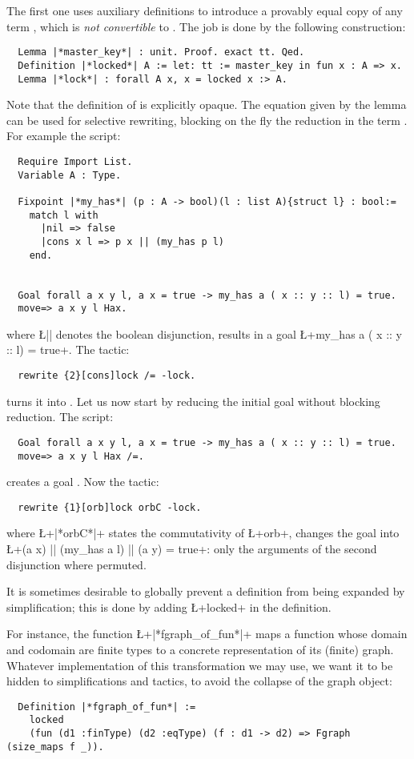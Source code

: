 The first one uses auxiliary definitions to introduce a provably equal
copy of any term , which is \emph{not convertible} to .
The job is done by the following construction:
\begin{lstlisting}
  Lemma |*master_key*| : unit. Proof. exact tt. Qed.
  Definition |*locked*| A := let: tt := master_key in fun x : A => x.
  Lemma |*lock*| : forall A x, x = locked x :> A.
\end{lstlisting}
Note that the definition of  is explicitly opaque.
The equation  given by the  lemma can be used
for selective rewriting, blocking on the fly the reduction in the
term .
For example the script:
\begin{lstlisting}
  Require Import List.
  Variable A : Type.

  Fixpoint |*my_has*| (p : A -> bool)(l : list A){struct l} : bool:=
    match l with
      |nil => false
      |cons x l => p x || (my_has p l)
    end.


  Goal forall a x y l, a x = true -> my_has a ( x :: y :: l) = true.
  move=> a x y l Hax.
\end{lstlisting}
where \L{||} denotes the boolean disjunction, results in a goal
\L+my_has a ( x :: y :: l) = true+. The tactic:
\begin{lstlisting}
  rewrite {2}[cons]lock /= -lock.
\end{lstlisting}
turns it into .
Let us now start by reducing the initial goal without blocking reduction.
The script:
\begin{lstlisting}
  Goal forall a x y l, a x = true -> my_has a ( x :: y :: l) = true.
  move=> a x y l Hax /=.
\end{lstlisting}
creates a goal . Now the
tactic:
\begin{lstlisting}
  rewrite {1}[orb]lock orbC -lock.
\end{lstlisting}
where \L+|*orbC*|+ states the commutativity of \L+orb+, changes the
goal into\\ \L+(a x) || (my_has a l) || (a y) = true+: only the
arguments of the second disjunction where permuted.


It is sometimes desirable to globally prevent a definition from being
expanded by simplification; this is done by adding \L+locked+ in the
definition.

For instance, the function \L+|*fgraph_of_fun*|+ maps a function whose
domain and codomain are finite types to a concrete representation of
its (finite) graph. Whatever implementation of this transformation we
may use, we want it to be hidden to simplifications and tactics, to
avoid the collapse of the graph object:
\begin{lstlisting}
  Definition |*fgraph_of_fun*| :=
    locked
    (fun (d1 :finType) (d2 :eqType) (f : d1 -> d2) => Fgraph (size_maps f _)).
\end{lstlisting}

